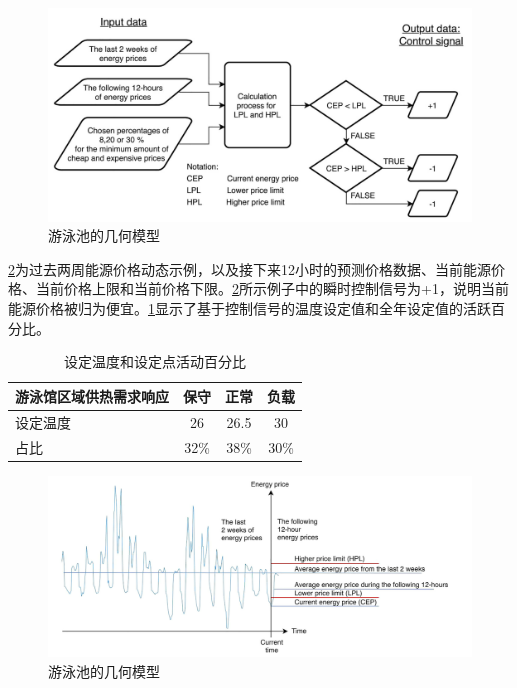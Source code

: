 \documentclass[hyperref]{ctexart}
\begin{document}
\begin{multicols}{2}
		\begin{figure}[htbp]
			\centering
			\includegraphics[scale=0.4]{figure_translate/7.png}
			\caption{游泳池的几何模型}
			\label{fig7}
		\end{figure}
		\cref{fig8}为过去两周能源价格动态示例，以及接下来12小时的预测价格数据、当前能源价格、当前价格上限和当前价格下限。\cref{fig8}所示例子中的瞬时控制信号为+1，说明当前能源价格被归为便宜。\cref{tab10}显示了基于控制信号的温度设定值和全年设定值的活跃百分比。
		\par
		\begin{table}[H]
			\centering
			\caption{设定温度和设定点活动百分比}
			\begin{tabular}{p{10em}ccc}
				\hline    
				游泳馆区域供热需求响应 & 保守 & 正常 & 负载\\
				\hline  
				设定温度 & 26\textcelsius & 26.5\textcelsius & 30\textcelsius\\
				占比 & 32\% & 38\% & 30\% \\
				\hline   
			\end{tabular}
			\label{tab10}
		\end{table}
		\begin{figure}[htbp]
			\centering
			\includegraphics[scale=0.4]{figure_translate/8.png}
			\caption{游泳池的几何模型}
			\label{fig8}
		\end{figure}

\end{multicols}
\end{document}
